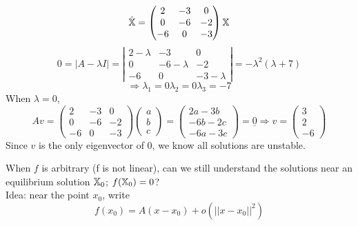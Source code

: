 \begin{example}
\[\dot{\mathbb{X}}=\begin{pmatrix}2&-3&0\\0&-6&-2\\-6&0&-3\end{pmatrix}\mathbb{X}\]
\[0=|A-\lambda I|=\left|\begin{array}{ccc}2-\lambda&-3&0\\0&-6-\lambda&-2\\-6&0&-3-\lambda\end{array}\right|=-\lambda^2(\lambda+7)
\]
\[\Rightarrow \lambda_1=0  \lambda_2=0 \lambda_3=-7
\]
When $\lambda=0$,
\[Av=\begin{pmatrix}2&-3&0\\0&-6&-2\\-6&0&-3\end{pmatrix}\begin{pmatrix}a\\b\\c\end{pmatrix}=\begin{pmatrix}2a-3b\\-6b-2c\\-6a-3c\end{pmatrix}=\underline{0}\Rightarrow v=\begin{pmatrix}3\\2\\-6\end{pmatrix}
\]
Since $v$ is the only eigenvector of 0, we know all solutions are unstable.
\end{example}

When $f$ is arbitrary (f is not linear), can we still understand the solutions near an equilibrium solution $\mathbb{X}_0$; $f(\mathbb{X}_0)=0$?\\
Idea: near the point $x_0$, write 
\[f(x_0)=A(x-x_0)+o(||x-x_0||^2)
\]







